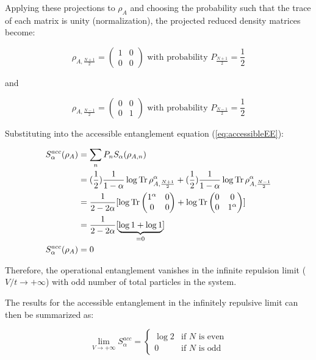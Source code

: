 \begin{samepage}
Applying these projections to $\rho_{A}$ and choosing the probability such that the trace of each matrix is unity (normalization), the projected reduced density matrices become:

\begin{equation}
\rho_{A,{\frac{N+1}{2}}} = \begin{pmatrix} 1 & 0 \\ 0 & 0 \end{pmatrix}  \text{ with probability } P_{\frac{N+1}{2}} = \frac{1}{2}
\end{equation}

and 

\begin{equation}
\rho_{A,{\frac{N-1}{2}}} = \begin{pmatrix} 0 & 0 \\ 0 & 1 \end{pmatrix}  \text{ with probability } P_{\frac{N-1}{2}} = \frac{1}{2}
\end{equation}

Substituting into the accessible entanglement equation (\ref{eq:accessibleEE}):

\begin {align} 
S_{\alpha}^{acc}(\rho_A) &= \sum_{n} P_n S_{\alpha}(\rho_{A,n}) \nonumber \\
&= (\frac{1}{2})\frac{1}{1-\alpha} \log{\operatorname{Tr}{\rho_{A,\frac{N+1}{2}}^{\alpha}}} + (\frac{1}{2})\frac{1}{1-\alpha} \log{\operatorname{Tr}{\rho_{A,\frac{N-1}{2}}^{\alpha}}} \nonumber \\
&=\frac{1}{2-2\alpha}[ \log{\operatorname{Tr}{\begin{pmatrix}  1^{\alpha} & 0 \\ 0 & 0   \end{pmatrix}}} + \log{\operatorname{Tr}{\begin{pmatrix}  0 & 0 \\ 0 & 1^{\alpha}   \end{pmatrix}}}] \nonumber \\
&=  \frac{1}{2-2\alpha}[ \underbrace{\log{1} + \log{1}}_{=0} ] \nonumber \\
S_{\alpha}^{acc}(\rho_A) &= 0
\end {align}

Therefore, the operational entanglement vanishes in the infinite repulsion limit ($V/t \to + \infty$) with odd number of total particles in the system.

The results for the accessible entanglement in the infinitely repulsive limit can then be summarized as:

\begin{equation}
\lim_{V \to + \infty} S_{\alpha}^{acc} =
\begin{cases}
\log{2}  & \text{if }N\text{ is even} \\
0 & \text{if }N\text{ is odd}
\end{cases}
\end{equation}

\end{samepage}

